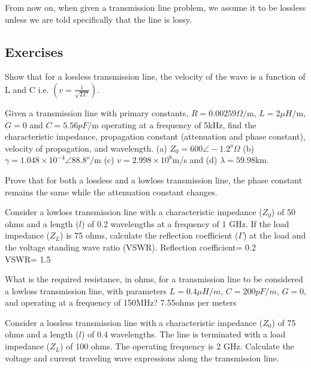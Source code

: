 From now on, when given a transmission line problem, we assume it to be lossless unless we are told specifically that the line is lossy.


\begin{mdframed}[backgroundcolor=lightblue, linewidth=1pt, hidealllines=true]
\section*{Exercises}
\begin{ExerciseList}
\Exercise[label={ex41}]
Show that for a lossless transmission line, the velocity of the wave is a function of L and C i.e. $\left(v = \frac{1}{\sqrt{LC}}\right)$.

\Exercise[label={ex42}]
Given a transmission line with primary constants, $R = 0.00259\varOmega/$m, $L = 2\mu H/$m, $G = 0$ and $C = 5.56pF/$m operating at a frequency of 5kHz, find the characteristic impedance, propagation constant (attenuation and phase constant), velocity of propagation, and wavelength.
\Answer[ref={ex42}]
(a) $Z_0 = 600\angle-1.2^o\varOmega$ (b) $\gamma = 1.048\times10^{-4}\angle88.8^o/$m (c) $v = 2.998\times10^8$m/s and (d) $\lambda = 59.98$km.

\Exercise[label={ex43}]
Prove that for both a lossless and a lowloss transmission line, the phase constant remains the same while the attenuation constant changes.

\Exercise[label={ex44}]
Consider a lowloss transmission line with a characteristic impedance ($Z_0$) of 50 ohms and a length ($l$) of 0.2 wavelengths at a frequency of 1 GHz. If the load impedance ($Z_L$) is 75 ohms, calculate the reflection coefficient ($\Gamma$) at the load and the voltage standing wave ratio (VSWR).
\Answer[ref={ex44}]
Reflection coefficient=  0.2 \\
VSWR= 1.5

\Exercise[label={ex45}]
What is the required resistance, in ohms, for a transmission line to be considered a lowloss transmission line, with parameters $L=0.4\mu H/m$, $C=200pF/m$, $G=0$, and operating at a frequency of 150MHz?
\Answer[ref={ex45}]
7.55ohms per meters

\Exercise[label={ex46}]
Consider a lossless transmission line with a characteristic impedance ($Z_0$) of 75 ohms and a length ($l$) of 0.4 wavelengths. The line is terminated with a load impedance ($Z_L$) of 100 ohms. The operating frequency is 2 GHz.
Calculate the voltage and current traveling wave expressions along the transmission line.


\end{ExerciseList}
\end{mdframed}
